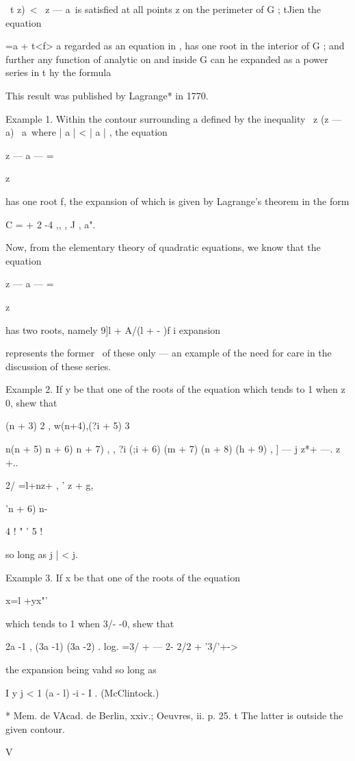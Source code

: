 \ t z)\ < \ z — a\ is satisfied at all points z on the perimeter of G
; tJien the equation

 =a + t<f> a regarded as an equation in , has one root in the interior
of G ; and further any function of analytic on and inside G can he
expanded as a power series in t hy the formula

This result was published by Lagrange* in 1770.

Example 1. Within the contour surrounding a defined by the inequality
\ z (z — a) \ a\, where | a | < | a | , the equation

z — a — =

z

has one root f, the expansion of which is given by Lagrange's theorem
in the form

C = + 2 -4 ,, , J , a".

Now, from the elementary theory of quadratic equations, we know that
the equation

z — a — =

z

has two roots, namely 9]l + A/(l + - )f i %
expansion

represents the former \ of these only — an example of the need for
care in the discussion of these series.

Example 2. If y be that one of the roots of the equation which tends
to 1 when z~ 0, shew that

 (n + 3) 2 , w(n+4),(?i + 5) 3

n(n + 5) n + 6) n + 7) , , ?i (;i + 6) (m + 7) (n + 8) (h + 9) , ] — j
z*+ —. z +..

2/ =l+nz+ , ' z + g,

'n + 6) n-

4 ! " ' 5 !

so long as j | < j.

Example 3. If x be that one of the roots of the equation

x=l +yx"'

which tends to 1 when 3/- -0, shew that

2a -1 , (3a -1) (3a -2) . log. =3/ + — 2- 2/2 + '3/'+->

the expansion being vahd so long as

I y j < 1 (a - l) -i - I . (McClintock.)

* Mem. de VAcad. de Berlin, xxiv.; Oeuvres, ii. p. 25. t The latter is
outside the given contour.

V

